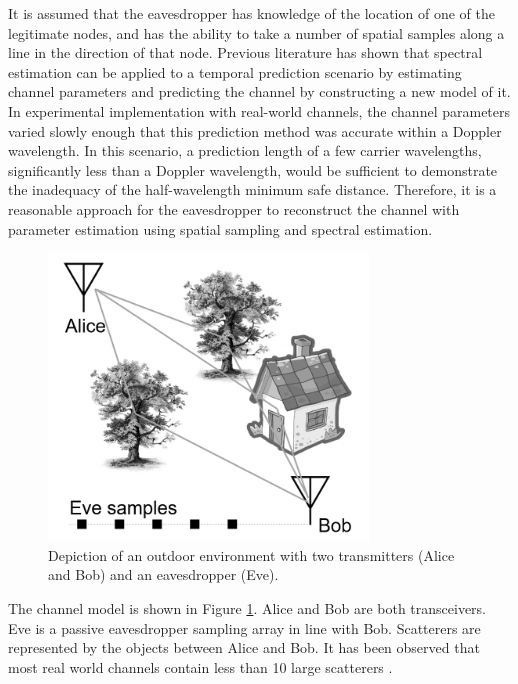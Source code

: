 \documentclass{allertonproc}
\begin{document}

It is assumed that the eavesdropper has knowledge of the location of one of the legitimate nodes, and has the ability to take a number of spatial samples along a line in the direction of that node.  Previous literature \cite{duel-hallen2007} has shown that spectral estimation can be applied to a temporal prediction scenario by estimating channel parameters and predicting the channel by constructing a new model of it. In experimental implementation with real-world channels, the channel parameters varied slowly enough that this prediction method was accurate within a Doppler wavelength. In this scenario, a prediction length of a few carrier wavelengths, significantly less than a Doppler wavelength, would be sufficient to demonstrate the inadequacy of the half-wavelength minimum safe distance. Therefore, it is a reasonable approach for the eavesdropper to reconstruct the channel with parameter estimation using spatial sampling and spectral estimation. 


\begin{figure}[tbp]
\begin{center}
\includegraphics[height=3in]{Scenario}
\caption{Depiction of an outdoor environment with two transmitters (Alice and Bob) and an eavesdropper (Eve).}\label{scene}
\end{center}
\end{figure}

The channel model is shown in Figure \ref{scene}. Alice and Bob are both transceivers. Eve is a passive eavesdropper sampling array in line with Bob. Scatterers are represented by the objects between Alice and Bob. It has been observed that most real world channels contain less than 10 large scatterers \cite{duel-hallen2000}. 
\end{document}
